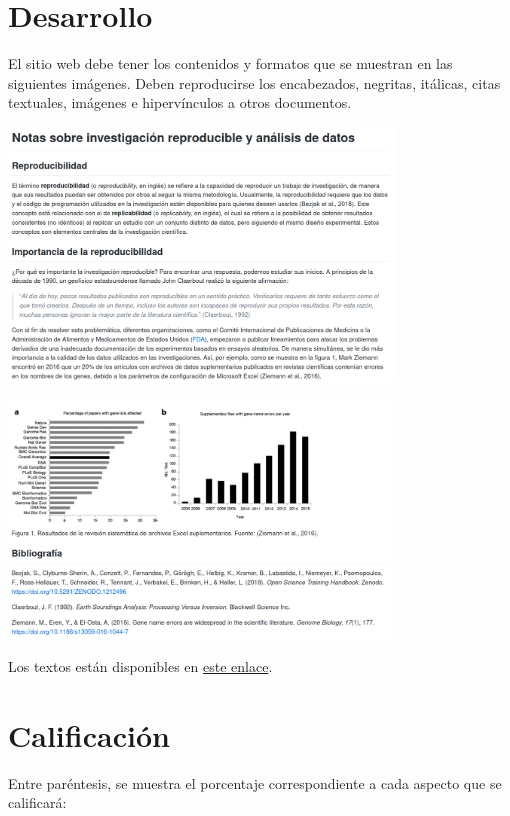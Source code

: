 \documentclass[
  letterpaper,
  DIV=11,
  numbers=noendperiod]{scrreprt}
\begin{document}
\hypertarget{desarrollo}{%
\section*{Desarrollo}\label{desarrollo}}

El sitio web debe tener los contenidos y formatos que se muestran en las
siguientes imágenes. Deben reproducirse los encabezados, negritas,
itálicas, citas textuales, imágenes e hipervínculos a otros documentos.

\includegraphics[width=4.02in,height=\textheight]{./img/tarea-01-img-01.png}

\includegraphics[width=4.01in,height=\textheight]{./img/tarea-01-img-02.png}

Los textos están disponibles en \href{otros/tarea-01-texto.txt}{este
enlace}.

\hypertarget{calificaciuxf3n}{%
\section*{Calificación}\label{calificaciuxf3n}}

Entre paréntesis, se muestra el porcentaje correspondiente a cada
aspecto que se calificará:
\end{document}
